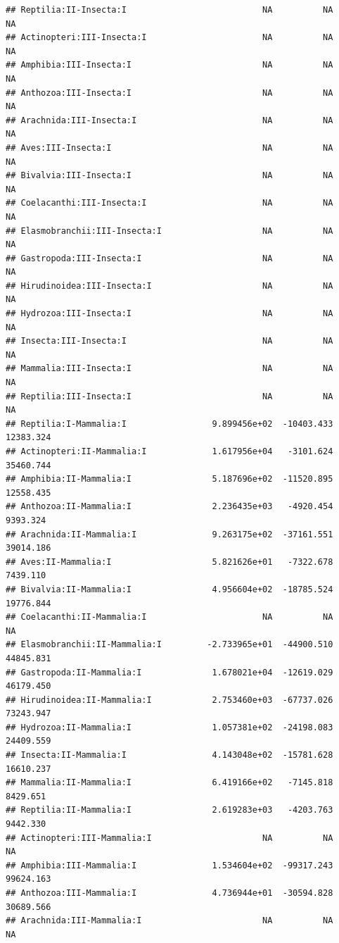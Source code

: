 \documentclass[
  12pt,
]{article}
\begin{document}
\begin{verbatim}
## Reptilia:II-Insecta:I                           NA          NA          NA
## Actinopteri:III-Insecta:I                       NA          NA          NA
## Amphibia:III-Insecta:I                          NA          NA          NA
## Anthozoa:III-Insecta:I                          NA          NA          NA
## Arachnida:III-Insecta:I                         NA          NA          NA
## Aves:III-Insecta:I                              NA          NA          NA
## Bivalvia:III-Insecta:I                          NA          NA          NA
## Coelacanthi:III-Insecta:I                       NA          NA          NA
## Elasmobranchii:III-Insecta:I                    NA          NA          NA
## Gastropoda:III-Insecta:I                        NA          NA          NA
## Hirudinoidea:III-Insecta:I                      NA          NA          NA
## Hydrozoa:III-Insecta:I                          NA          NA          NA
## Insecta:III-Insecta:I                           NA          NA          NA
## Mammalia:III-Insecta:I                          NA          NA          NA
## Reptilia:III-Insecta:I                          NA          NA          NA
## Reptilia:I-Mammalia:I                 9.899456e+02  -10403.433   12383.324
## Actinopteri:II-Mammalia:I             1.617956e+04   -3101.624   35460.744
## Amphibia:II-Mammalia:I                5.187696e+02  -11520.895   12558.435
## Anthozoa:II-Mammalia:I                2.236435e+03   -4920.454    9393.324
## Arachnida:II-Mammalia:I               9.263175e+02  -37161.551   39014.186
## Aves:II-Mammalia:I                    5.821626e+01   -7322.678    7439.110
## Bivalvia:II-Mammalia:I                4.956604e+02  -18785.524   19776.844
## Coelacanthi:II-Mammalia:I                       NA          NA          NA
## Elasmobranchii:II-Mammalia:I         -2.733965e+01  -44900.510   44845.831
## Gastropoda:II-Mammalia:I              1.678021e+04  -12619.029   46179.450
## Hirudinoidea:II-Mammalia:I            2.753460e+03  -67737.026   73243.947
## Hydrozoa:II-Mammalia:I                1.057381e+02  -24198.083   24409.559
## Insecta:II-Mammalia:I                 4.143048e+02  -15781.628   16610.237
## Mammalia:II-Mammalia:I                6.419166e+02   -7145.818    8429.651
## Reptilia:II-Mammalia:I                2.619283e+03   -4203.763    9442.330
## Actinopteri:III-Mammalia:I                      NA          NA          NA
## Amphibia:III-Mammalia:I               1.534604e+02  -99317.243   99624.163
## Anthozoa:III-Mammalia:I               4.736944e+01  -30594.828   30689.566
## Arachnida:III-Mammalia:I                        NA          NA          NA

\end{verbatim}
\end{document}
